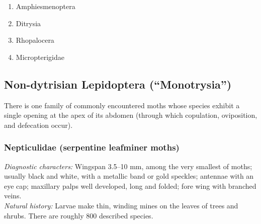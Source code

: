 \documentclass[letterpaper, 11pt]{article}
\begin{document}
\begin{enumerate} 
\item Amphiesmenoptera
\item Ditrysia
\item Rhopalocera
\item Micropterigidae
\end{enumerate}

\subsection{Non-dytrisian Lepidoptera (``Monotrysia'')}
There is one family of commonly encountered moths whose species exhibit a single opening at the apex of its abdomen (through which copulation, oviposition, and defecation occur).

\subsubsection{Nepticulidae (serpentine leafminer moths)}
\noindent{}\textit{Diagnostic characters:} Wingspan 3.5--10 mm, among the very smallest of moths; usually black and white, with a metallic band or gold speckles; antennae with an eye cap; maxillary palps well developed, long and folded; fore wing with branched veins.\\

\noindent{}\textit{Natural history:} Larvae make thin, winding mines on the leaves of trees and shrubs. There are roughly 800 described species.
\end{document}
